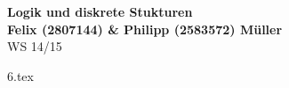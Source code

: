 \documentclass[letterpaper, 12pt, a4paper]{article}
\begin{document}


	\begin{center}
	{\Large{\bfseries{Logik und diskrete Stukturen}}}\\[0.5cm]
	{\large{\bfseries{Felix (2807144) \& Philipp (2583572) Müller}}}\\[0.4cm]
	WS 14/15
	\end{center}


	{6.tex}
\end{document}
